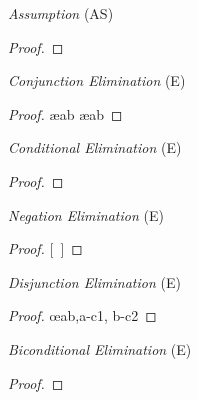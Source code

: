 \documentclass[a4paper, 11pt]{article} %
\begin{document}
\begin{multicols}{2}
  \vfill
  \strut
  \columnbreak

  \textit{Assumption} (AS)
  \begin{proof}
    \open
       \as{}{}
  \end{proof}
  \medskip

  \textit{Conjunction Elimination} (\eand E)
  \begin{proof}
     \ae{ab}
     \ae{ab}
  \end{proof}
  \medskip

  \textit{Conditional Elimination} (\eif E)
  \begin{proof}
     
  \end{proof}
  \medskip

  \textit{Negation Elimination} (\enot E)
  \begin{proof}
  \open
     
    \ellipsesline
    \metaB
  \close
  [\ ]\metaA{}
  \end{proof}
  \medskip

  \textit{Disjunction Elimination} (\eor E)
  \begin{proof}
    \open
       
    \close
  \breakline
    \open
       
    \close
     \oe{ab,a-c1, b-c2}
  \end{proof}
  \medskip

  \textit{Biconditional Elimination} (\eiff E)
  \begin{proof}
     
  \end{proof}
  \medskip

\end{multicols}
\end{document}
